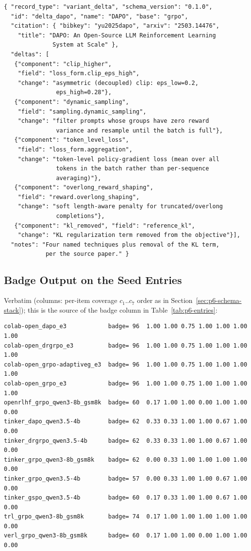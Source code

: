 \begin{lstlisting}[basicstyle=\ttfamily\scriptsize, frame=single,
  caption={\texttt{entries/delta_dapo.json} (whitespace compressed).},
  label={lst:p6-delta-dapo}]
{ "record_type": "variant_delta", "schema_version": "0.1.0",
  "id": "delta_dapo", "name": "DAPO", "base": "grpo",
  "citation": { "bibkey": "yu2025dapo", "arxiv": "2503.14476",
    "title": "DAPO: An Open-Source LLM Reinforcement Learning
              System at Scale" },
  "deltas": [
   {"component": "clip_higher",
    "field": "loss_form.clip_eps_high",
    "change": "asymmetric (decoupled) clip: eps_low=0.2,
               eps_high=0.28"},
   {"component": "dynamic_sampling",
    "field": "sampling.dynamic_sampling",
    "change": "filter prompts whose groups have zero reward
               variance and resample until the batch is full"},
   {"component": "token_level_loss",
    "field": "loss_form.aggregation",
    "change": "token-level policy-gradient loss (mean over all
               tokens in the batch rather than per-sequence
               averaging)"},
   {"component": "overlong_reward_shaping",
    "field": "reward.overlong_shaping",
    "change": "soft length-aware penalty for truncated/overlong
               completions"},
   {"component": "kl_removed", "field": "reference_kl",
    "change": "KL regularization term removed from the objective"}],
  "notes": "Four named techniques plus removal of the KL term,
            per the source paper." }
\end{lstlisting}

\subsection{Badge Output on the Seed Entries}
\label{sec:p6-appendix-badge}
Verbatim (columns: per-item coverage $c_1..c_7$ order as in
Section~\ref{sec:p6-schema-stack}); this is the source of the badge column in
Table~\ref{tab:p6-entries}:

\begin{lstlisting}[basicstyle=\ttfamily\scriptsize, frame=single,
  caption={\texttt{python3 registry/query.py badge} (item columns
  abbreviated).}, label={lst:p6-badge-out}]
colab-open_dapo_e3            badge= 96  1.00 1.00 0.75 1.00 1.00 1.00 1.00
colab-open_drgrpo_e3          badge= 96  1.00 1.00 0.75 1.00 1.00 1.00 1.00
colab-open_grpo-adaptiveg_e3  badge= 96  1.00 1.00 0.75 1.00 1.00 1.00 1.00
colab-open_grpo_e3            badge= 96  1.00 1.00 0.75 1.00 1.00 1.00 1.00
openrlhf_grpo_qwen3-8b_gsm8k  badge= 60  0.17 1.00 1.00 0.00 1.00 1.00 0.00
tinker_dapo_qwen3.5-4b        badge= 62  0.33 0.33 1.00 1.00 0.67 1.00 0.00
tinker_drgrpo_qwen3.5-4b      badge= 62  0.33 0.33 1.00 1.00 0.67 1.00 0.00
tinker_grpo_qwen3-8b_gsm8k    badge= 62  0.00 0.33 1.00 1.00 1.00 1.00 0.00
tinker_grpo_qwen3.5-4b        badge= 57  0.00 0.33 1.00 1.00 0.67 1.00 0.00
tinker_gspo_qwen3.5-4b        badge= 60  0.17 0.33 1.00 1.00 0.67 1.00 0.00
trl_grpo_qwen3-8b_gsm8k       badge= 74  0.17 1.00 1.00 1.00 1.00 1.00 0.00
verl_grpo_qwen3-8b_gsm8k      badge= 60  0.17 1.00 1.00 0.00 1.00 1.00 0.00
\end{lstlisting}

